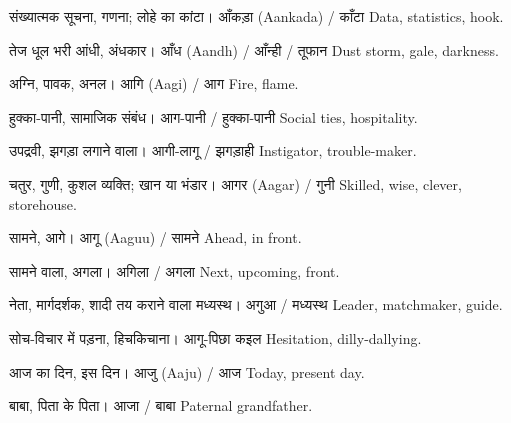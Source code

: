 %
{संख्यात्मक सूचना, गणना; लोहे का कांटा।}%
{आँकड़ा (Aankada) / काँटा}%
{Data, statistics, hook.}

%
{तेज धूल भरी आंधी, अंधकार।}%
{आँध (Aandh) / आँन्ही / तूफान}%
{Dust storm, gale, darkness.}

%
{अग्नि, पावक, अनल।}%
{आगि (Aagi) / आग}%
{Fire, flame.}

%
{हुक्का-पानी, सामाजिक संबंध।}%
{आग-पानी / हुक्का-पानी}%
{Social ties, hospitality.}

%
{उपद्रवी, झगड़ा लगाने वाला।}%
{आगी-लागू / झगड़ाही}%
{Instigator, trouble-maker.}

%
{चतुर, गुणी, कुशल व्यक्ति; खान या भंडार।}%
{आगर (Aagar) / गुनी}%
{Skilled, wise, clever, storehouse.}

%
{सामने, आगे।}%
{आगू (Aaguu) / सामने}%
{Ahead, in front.}

%
{सामने वाला, अगला।}%
{अगिला / अगला}%
{Next, upcoming, front.}

%
{नेता, मार्गदर्शक, शादी तय कराने वाला मध्यस्थ।}%
{अगुआ / मध्यस्थ}%
{Leader, matchmaker, guide.}

%
{सोच-विचार में पड़ना, हिचकिचाना।}%
{आगू-पिछा कइल}%
{Hesitation, dilly-dallying.}

%
{आज का दिन, इस दिन।}%
{आजु (Aaju) / आज}%
{Today, present day.}

%
{बाबा, पिता के पिता।}%
{आजा / बाबा}%
{Paternal grandfather.}

